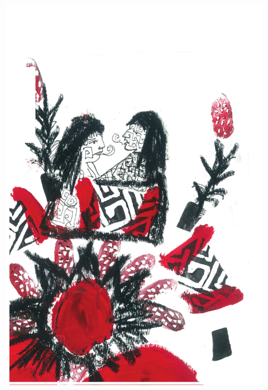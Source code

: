 \pagebreak
\thispagestyle{empty}
\begin{figure}
\vspace*{-.5cm}
\hspace*{-2.2cm}\includegraphics[width=138mm]{./imgs/img5.pdf}
\end{figure}

\chapter*{}


